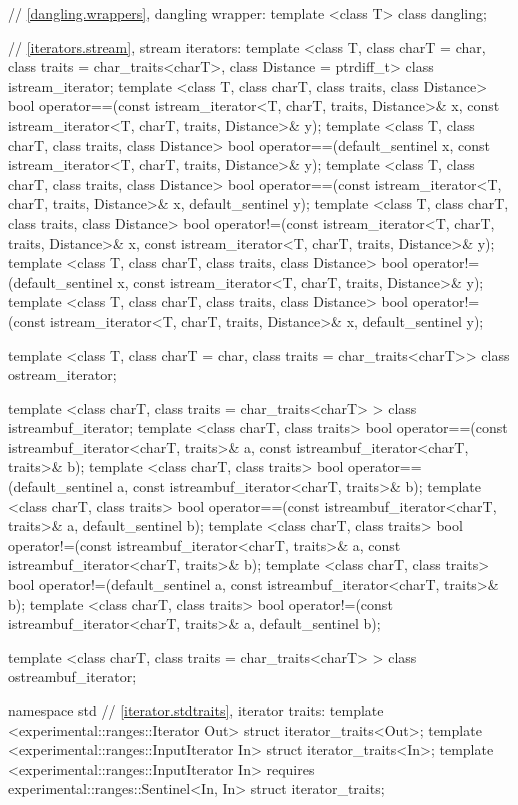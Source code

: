 \begin{codeblock}
{{{{  // \ref{dangling.wrappers}, dangling wrapper:
  template <class T> class dangling;

  // \ref{iterators.stream}, stream iterators:
  template <class T, class charT = char, class traits = char_traits<charT>,
      class Distance = ptrdiff_t>
  class istream_iterator;
  template <class T, class charT, class traits, class Distance>
    bool operator==(const istream_iterator<T, charT, traits, Distance>& x,
            const istream_iterator<T, charT, traits, Distance>& y);
  template <class T, class charT, class traits, class Distance>
    bool operator==(default_sentinel x,
            const istream_iterator<T, charT, traits, Distance>& y);
  template <class T, class charT, class traits, class Distance>
    bool operator==(const istream_iterator<T, charT, traits, Distance>& x,
            default_sentinel y);
  template <class T, class charT, class traits, class Distance>
    bool operator!=(const istream_iterator<T, charT, traits, Distance>& x,
            const istream_iterator<T, charT, traits, Distance>& y);
  template <class T, class charT, class traits, class Distance>
   bool operator!=(default_sentinel x,
            const istream_iterator<T, charT, traits, Distance>& y);
  template <class T, class charT, class traits, class Distance>
    bool operator!=(const istream_iterator<T, charT, traits, Distance>& x,
            default_sentinel y);

  template <class T, class charT = char, class traits = char_traits<charT>>
      class ostream_iterator;

  template <class charT, class traits = char_traits<charT> >
    class istreambuf_iterator;
  template <class charT, class traits>
    bool operator==(const istreambuf_iterator<charT, traits>& a,
            const istreambuf_iterator<charT, traits>& b);
  template <class charT, class traits>
    bool operator==(default_sentinel a,
            const istreambuf_iterator<charT, traits>& b);
  template <class charT, class traits>
    bool operator==(const istreambuf_iterator<charT, traits>& a,
            default_sentinel b);
  template <class charT, class traits>
    bool operator!=(const istreambuf_iterator<charT, traits>& a,
            const istreambuf_iterator<charT, traits>& b);
  template <class charT, class traits>
    bool operator!=(default_sentinel a,
            const istreambuf_iterator<charT, traits>& b);
  template <class charT, class traits>
    bool operator!=(const istreambuf_iterator<charT, traits>& a,
            default_sentinel b);

  template <class charT, class traits = char_traits<charT> >
    class ostreambuf_iterator;
}}}}

namespace std {
  // \ref{iterator.stdtraits}, iterator traits:
  template <experimental::ranges::Iterator Out>
    struct iterator_traits<Out>;
  template <experimental::ranges::InputIterator In>
    struct iterator_traits<In>;
  template <experimental::ranges::InputIterator In>
      requires experimental::ranges::Sentinel<In, In>
    struct iterator_traits;
}
\end{codeblock}


